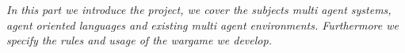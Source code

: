 \textit{In this part we introduce the project, we cover the subjects multi agent systems, agent oriented languages and existing multi agent environments. Furthermore we specify the rules and usage of the wargame we develop.} \\ \\
